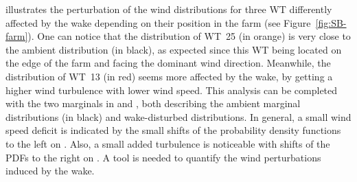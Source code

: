  illustrates the perturbation of the wind distributions for three WT differently affected by the wake depending on their position in the farm (see Figure~\ref{fig:SB-farm}). 
One can notice that the distribution of WT~25 (in orange) is very close to the ambient distribution (in black), as expected since this WT being located on the edge of the farm and facing the dominant wind direction. 
Meanwhile, the distribution of WT~13 (in red) seems more affected by the wake, by getting a higher wind turbulence with lower wind speed. 
This analysis can be completed with the two marginals in  and , both describing the ambient marginal distributions (in black) and wake-disturbed distributions. 
In general, a small wind speed deficit is indicated by the small shifts of the probability density functions to the left on . 
Also, a small added turbulence is noticeable with shifts of the PDFs to the right on . 
A tool is needed to quantify the wind perturbations induced by the wake.

